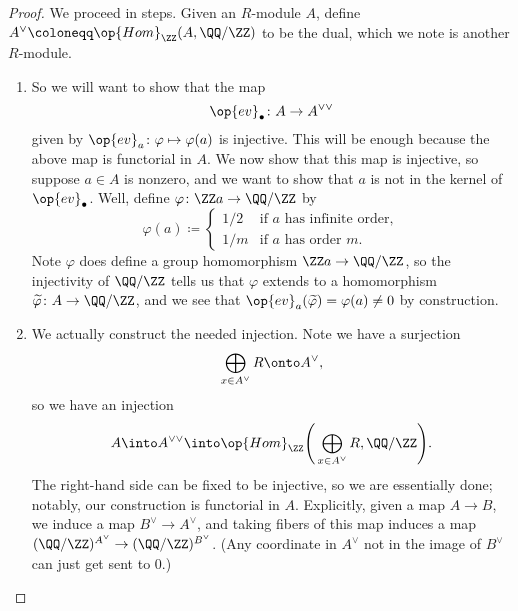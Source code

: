 \documentclass[../notes.tex]{subfiles}
\begin{document}
\begin{proof}
	We proceed in steps. Given an $R$-module $A$, define $A^\lor\coloneqq\op{Hom}_\ZZ(A,\QQ/\ZZ)$ to be the dual, which we note is another $R$-module.
	\begin{enumerate}
		\item So we will want to show that the map
		\[\op{ev}_\bullet\colon A\to A^{\lor\lor}\]
		given by $\op{ev}_a\colon\varphi\mapsto\varphi(a)$ is injective. This will be enough because the above map is functorial in $A$. We now show that this map is injective, so suppose $a\in A$ is nonzero, and we want to show that $a$ is not in the kernel of $\op{ev}_\bullet$. Well, define $\varphi\colon\ZZ a\to\QQ/\ZZ$ by
		\[\varphi(a)\coloneqq\begin{cases}
			1/2 & \text{if }a\text{ has infinite order}, \\
			1/m & \text{if }a\text{ has order }m.
		\end{cases}\]
		Note $\varphi$ does define a group homomorphism $\ZZ a\to\QQ/\ZZ$, so the injectivity of $\QQ/\ZZ$ tells us that $\varphi$ extends to a homomorphism $\widetilde\varphi\colon A\to\QQ/\ZZ$, and we see that $\op{ev}_a(\widetilde\varphi)=\varphi(a)\ne0$ by construction.

		\item We actually construct the needed injection. Note we have a surjection
		\[\bigoplus_{x\in A^\lor}R\onto A^\lor,\]
		so we have an injection
		\[A\into A^{\lor\lor}\into\op{Hom}_\ZZ\Bigg(\bigoplus_{x\in A^\lor}R,\QQ/\ZZ\Bigg).\]
		The right-hand side can be fixed to be injective, so we are essentially done; notably, our construction is functorial in $A$. Explicitly, given a map $A\to B$, we induce a map $B^\lor\to A^\lor$, and taking fibers of this map induces a map $(\QQ/\ZZ)^{A^\lor}\to(\QQ/\ZZ)^{B^\lor}$. (Any coordinate in $A^\lor$ not in the image of $B^\lor$ can just get sent to $0$.)
		\qedhere
	\end{enumerate}
\end{proof}
\end{document}
